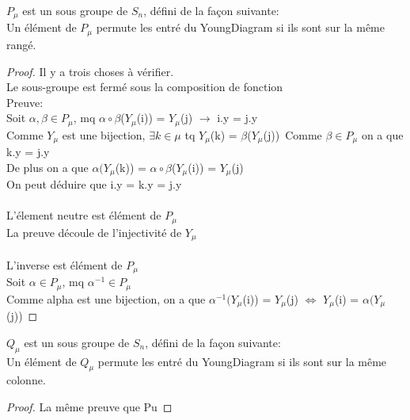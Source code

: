 \begin{definition}[Pu]
    \label{Pu}
    \leanok
    $P_{\mu}$ est un sous groupe de $S_{n}$, défini de la façon suivante:\\
    Un élément de $P_{\mu}$ permute les entré du YoungDiagram si ils sont sur la même rangé.
\end{definition}
\begin{proof}
    \leanok
    Il y a trois choses à vérifier.\\
    Le sous-groupe est fermé sous la composition de fonction\\
    Preuve:\\
    Soit $\alpha, \beta \in P_{\mu}$, mq $\alpha \circ \beta$($Y_{\mu}$(i)) = $Y_{\mu}$(j) $\to$ i.y = j.y\\
    Comme $Y_{\mu}$ est une bijection, $\exists k \in \mu$ tq $Y_{\mu}$(k) = $\beta$($Y_{\mu}$(j))\
    Comme $\beta \in P_{\mu}$ on a que k.y = j.y\\
    De plus on a que $\alpha (Y_{\mu}$(k)) = $\alpha \circ \beta$($Y_{\mu}$(i)) = $Y_{\mu}$(j)\\
    On peut déduire que i.y = k.y = j.y\\
    \\
    L'élement neutre est élément de $P_{\mu}$\\
    La preuve découle de l'injectivité de $Y_{\mu}$\\
    \\
    L'inverse est élément de $P_{\mu}$\\
    Soit $\alpha \in P_{\mu}$, mq $\alpha^{-1} \in P_{\mu}$\\
    Comme alpha est une bijection, on a que $\alpha^{-1} (Y_{\mu}$(i)) = $Y_{\mu}$(j) $\Leftrightarrow$ $Y_{\mu}$(i) = $\alpha (Y_{\mu}$(j))
\end{proof}

\begin{definition}[Qu]
    \label{Qu}
    \leanok
    $Q_{\mu}$ est un sous groupe de $S_{n}$, défini de la façon suivante:\\
    Un élément de $Q_{\mu}$ permute les entré du YoungDiagram si ils sont sur la même colonne.
\end{definition}
\begin{proof}
    \leanok
    La même preuve que Pu
\end{proof}

